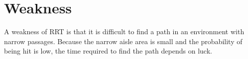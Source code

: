 \documentclass{article} %
\begin{document}

\section{Weakness}

    A weakness of RRT is that it is difficult to find a path in an environment with narrow passages. Because the narrow aisle area is small and the probability of being hit is low, the time required to find the path depends on luck.
\end{document}
